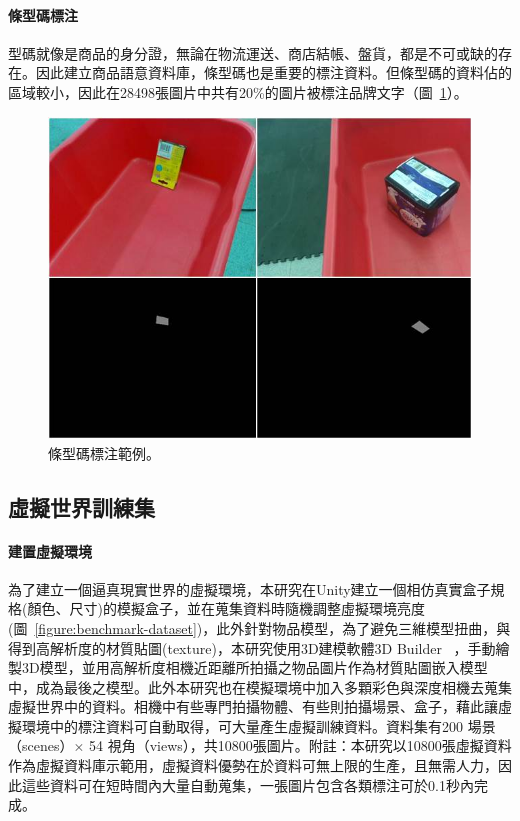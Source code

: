 \paragraph{條型碼標注}
型碼就像是商品的身分證，無論在物流運送、商店結帳、盤貨，都是不可或缺的存在。因此建立商品語意資料庫，條型碼也是重要的標注資料。但條型碼的資料佔的區域較小，因此在28498張圖片中共有20\%的圖片被標注品牌文字（圖~\ref{figure:barcode_label_example}）。

\begin{figure}[H]
	\centering
	\includegraphics[height=!, width=0.8\linewidth, keepaspectratio=true]
	{./figures/barcode_label_example.jpg}
  \caption{條型碼標注範例。}
  \label{figure:barcode_label_example}
\end{figure}

\subsection{虛擬世界訓練集}
\paragraph{建置虛擬環境}
為了建立一個逼真現實世界的虛擬環境，本研究在Unity建立一個相仿真實盒子規格(顏色、尺寸)的模擬盒子，並在蒐集資料時隨機調整虛擬環境亮度(圖~\ref{figure:benchmark-dataset})，此外針對物品模型，為了避免三維模型扭曲，與得到高解析度的材質貼圖(texture)，本研究使用3D建模軟體3D Builder ~\cite{3DBuilder}，手動繪製3D模型，並用高解析度相機近距離所拍攝之物品圖片作為材質貼圖嵌入模型中，成為最後之模型。此外本研究也在模擬環境中加入多顆彩色與深度相機去蒐集虛擬世界中的資料。相機中有些專門拍攝物體、有些則拍攝場景、盒子，藉此讓虛擬環境中的標注資料可自動取得，可大量產生虛擬訓練資料。資料集有200 場景（scenes）$\times$ 54 視角（views），共10800張圖片。附註：本研究以10800張虛擬資料作為虛擬資料庫示範用，虛擬資料優勢在於資料可無上限的生產，且無需人力，因此這些資料可在短時間內大量自動蒐集，一張圖片包含各類標注可於0.1秒內完成。

